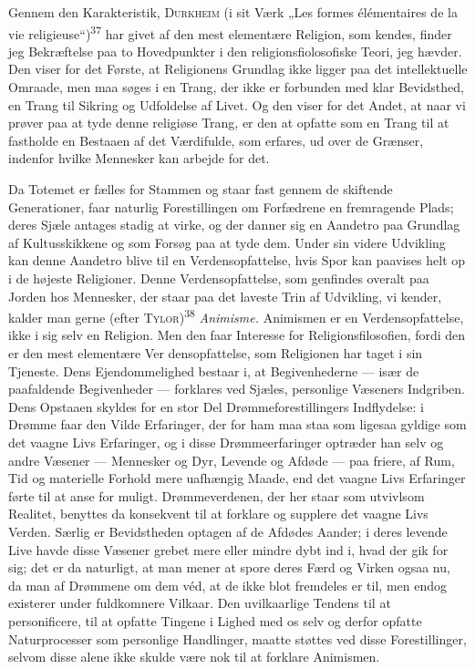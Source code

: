 \documentclass[12pt,a4paper,openany]{book}
\newcommand{\opage}[1]{\marginnote{\footnotesize\textit{[#1]}}}
\begin{document}
Gennem den Karakteristik, \textsc{Durkheim} (i sit Værk „Les formes
élémentaires de la vie religieuse“)\textsuperscript{37} har givet af den
mest elementære Religion, som kendes, finder jeg Bekræftelse paa to
Hovedpunkter i den religionsfiolosofiske Teori, jeg hævder. Den viser
for det Første, at Religionens Grundlag ikke ligger paa det
intellektuelle Omraade, men maa søges i en Trang, der ikke er forbunden
med klar Bevidsthed, en Trang til Sikring og Udfoldelse af Livet. Og den
viser for det Andet, at naar vi prøver paa at tyde denne religiøse
Trang, er den at opfatte som en Trang til at fastholde en Bestaaen af
det Værdifulde, som erfares, ud over de Grænser, indenfor hvilke
Mennesker kan arbejde for det.

Da Totemet er fælles for Stammen og staar fast gennem de skiftende
Generationer, faar naturlig Forestillingen om Forfædrene en fremragende
Plads; deres Sjæle antages stadig at virke, og der danner sig en
Aandetro paa Grundlag af Kultusskikkene og som Forsøg paa at tyde dem.
Under sin videre Udvikling kan denne Aandetro blive til en
Verdensopfattelse, hvis Spor kan paavises helt op i de højeste
Religioner. Denne Verdensopfattelse, som genfindes overalt paa Jorden
hos Mennesker, der staar paa det laveste Trin af Udvikling, vi kender,
kalder man gerne (efter \textsc{Tylor})\textsuperscript{38}
\textit{Animisme.} Animismen er en Verdensopfattelse, ikke i sig selv en
Religion. Men den faar Interesse for Religionsfilosofien, fordi den er
den mest elementære Ver%
\opage{88}densopfattelse, som Religionen har taget i sin Tjeneste. Dens
Ejendommelighed bestaar i, at Begivenhederne --- især de paafaldende
Begivenheder --- forklares ved Sjæles, personlige Væseners Indgriben.
Dens Opstaaen skyldes for en stor Del Drømmeforestillingers Indflydelse:
i Drømme faar den Vilde Erfaringer, der for ham maa staa som ligesaa
gyldige som det vaagne Livs Erfaringer, og i disse Drømmeerfaringer
optræder han selv og andre Væsener --- Mennesker og Dyr, Levende og
Afdøde --- paa friere, af Rum, Tid og materielle Forhold mere uafhængig
Maade, end det vaagne Livs Erfaringer førte til at anse for muligt.
Drømmeverdenen, der her staar som utvivlsom Realitet, benyttes da
konsekvent til at forklare og supplere det vaagne Livs Verden. Særlig er
Bevidstheden optagen af de Afdødes Aander; i deres levende Live havde
disse Væsener grebet mere eller mindre dybt ind i, hvad der gik for sig;
det er da naturligt, at man mener at spore deres Færd og Virken ogsaa
nu, da man af Drømmene om dem véd, at de ikke blot fremdeles er til, men
endog existerer under fuldkomnere Vilkaar. Den uvilkaarlige Tendens til
at personificere, til at opfatte Tingene i Lighed med os selv og derfor
opfatte Naturprocesser som personlige Handlinger, maatte støttes ved
disse Forestillinger, selvom disse alene ikke skulde være nok til at
forklare Animismen.
\end{document}
